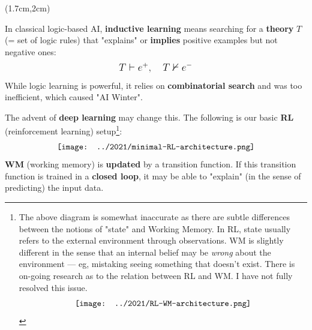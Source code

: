 \begin{preview}

\title{\vspace{-1.8cm} \bfseries\color{blue}{\Large AGI practical framework}}
\date{\vspace{-3cm}} %

\maketitle

\setcounter{section}{-1}

\begin{textblock*}{5cm}(1.7cm,2cm) %
{}
\end{textblock*}

\begin{minipage}{\textwidth}
In classical logic-based AI, \textbf{inductive learning} means searching for a \textbf{theory} $T$ (= set of logic rules) that "explains" or \textbf{implies} positive examples but not negative ones:
\begin{equation}
\mbox{\large\(
T \vdash e^{+}, \quad T \nvdash e^{-}
\)}
\end{equation}
While logic learning is powerful, it relies on \textbf{combinatorial search} and was too inefficient, which caused "AI Winter".

The advent of \textbf{deep learning} may change this.  The following is our basic \textbf{RL} (reinforcement learning) setup\footnote{The above diagram is somewhat inaccurate as there are subtle differences between the notions of "state" and Working Memory.  In RL, state usually refers to the external environment  through observations.  WM is slightly different in the sense that an internal belief may be \textit{wrong} about the environment --- eg, mistaking seeing something that doesn't exist.  There is on-going research as to the relation between RL and WM.  I have not fully resolved this issue.
\begin{equation}
\vcenter{\hbox{\texttt{[image: ../2021/RL-WM-architecture.png]}}}
\end{equation}
}:
\begin{equation}
\vcenter{\hbox{\texttt{[image: ../2021/minimal-RL-architecture.png]}}}
\end{equation}
\textbf{WM} (working memory) is \textbf{updated} by a transition function.  If this transition function is trained in a \textbf{closed loop}, it may be able to "explain" (in the sense of predicting) the input data.
\end{minipage}
\end{preview}
